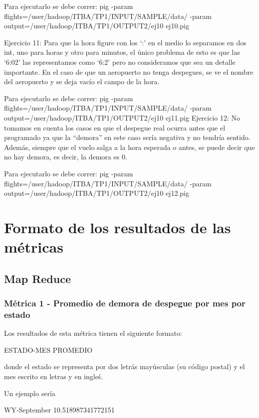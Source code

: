 \documentclass[a4paper,10pt]{article}
\begin{document}
Para ejecutarlo se debe correr:
pig -param flights=/user/hadoop/ITBA/TP1/INPUT/SAMPLE/data/ -param output=/user/hadoop/ITBA/TP1/OUTPUT2/ej10 ej10.pig

Ejercicio 11: Para que la hora figure con los ‘:’ en el medio lo separamos en dos int, uno para horas y otro para minutos, el único problema de esto es que las ‘6:02’ las representamos como ‘6:2’ pero no consideramos que sea un detalle importante.
En el caso de que un aeropuerto no tenga despegues, se ve el nombre del aeropuerto y se deja vacío el campo de la hora.

Para ejecutarlo se debe correr:
pig -param flights=/user/hadoop/ITBA/TP1/INPUT/SAMPLE/data/ -param output=/user/hadoop/ITBA/TP1/OUTPUT2/ej10 ej11.pig
Ejercicio 12:
No tomamos en cuenta los casos en que el despegue real ocurra antes que el programado ya que la “demora” en este caso sería negativa y no tendría sentido. Además, siempre que el vuelo salga a la hora esperada o antes, se puede decir que no hay demora, es decir, la demora es 0.

Para ejecutarlo se debe correr:
pig -param flights=/user/hadoop/ITBA/TP1/INPUT/SAMPLE/data/ -param output=/user/hadoop/ITBA/TP1/OUTPUT2/ej10 ej12.pig



\section{Formato de los resultados de las métricas}

    \subsection{Map Reduce}
        \subsubsection{Métrica 1 - Promedio de demora de despegue por mes por estado}
            Los resultados de esta métrica tienen el siguiente formato:\\
            \begin{center}
                ESTADO-MES PROMEDIO \\
            \end{center}
            donde el estado se representa por dos letrás mayúsculas (su código postal) y el mes escrito en letras y en ingleś.

            Un ejemplo sería\\
            \begin{center}
                WY-September    10.518987341772151\\
            \end{center}
\end{document}
